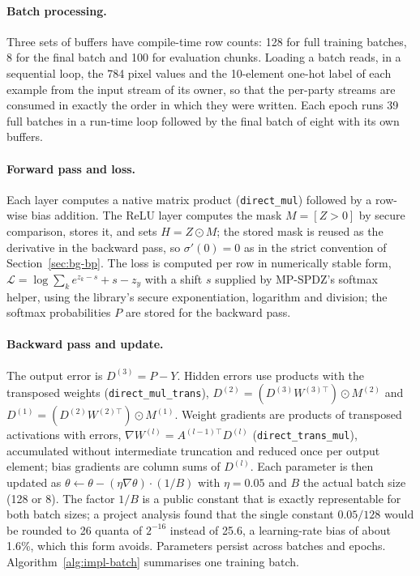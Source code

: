 \paragraph{Batch processing.} Three sets of buffers have compile-time row counts: 128 for full training batches, 8 for the final batch and 100 for evaluation chunks. Loading a batch reads, in a sequential loop, the 784 pixel values and the 10-element one-hot label of each example from the input stream of its owner, so that the per-party streams are consumed in exactly the order in which they were written. Each epoch runs 39 full batches in a run-time loop followed by the final batch of eight with its own buffers.

\paragraph{Forward pass and loss.} Each layer computes a native matrix product (\texttt{direct\_mul}) followed by a row-wise bias addition. The ReLU layer computes the mask $M=[Z>0]$ by secure comparison, stores it, and sets $H=Z\odot M$; the stored mask is reused as the derivative in the backward pass, so $\sigma'(0)=0$ as in the strict convention of Section~\ref{sec:bg-bp}. The loss is computed per row in numerically stable form, $\mathcal{L}=\log\sum_k e^{z_k-s}+s-z_y$ with a shift $s$ supplied by MP-SPDZ's softmax helper, using the library's secure exponentiation, logarithm and division; the softmax probabilities $P$ are stored for the backward pass.

\paragraph{Backward pass and update.} The output error is $D^{(3)}=P-Y$. Hidden errors use products with the transposed weights (\texttt{direct\_mul\_trans}), $D^{(2)}=(D^{(3)}W^{(3)\top})\odot M^{(2)}$ and $D^{(1)}=(D^{(2)}W^{(2)\top})\odot M^{(1)}$. Weight gradients are products of transposed activations with errors, $\nabla W^{(l)}=A^{(l-1)\top}D^{(l)}$ (\texttt{direct\_trans\_mul}), accumulated without intermediate truncation and reduced once per output element; bias gradients are column sums of $D^{(l)}$. Each parameter is then updated as $\theta\leftarrow\theta-(\eta\nabla\theta)\cdot(1/B)$ with $\eta=0.05$ and $B$ the actual batch size (128 or 8). The factor $1/B$ is a public constant that is exactly representable for both batch sizes; a project analysis found that the single constant $0.05/128$ would be rounded to 26 quanta of $2^{-16}$ instead of 25.6, a learning-rate bias of about 1.6\%, which this form avoids. Parameters persist across batches and epochs. Algorithm~\ref{alg:impl-batch} summarises one training batch.

